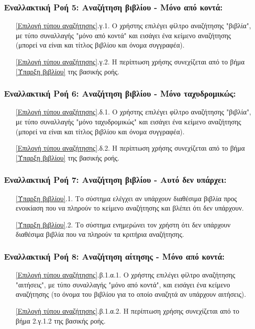\documentclass[12pt,a4paper]{article}
\begin{document}
\subsubsection*{Εναλλακτική Ροή 5: Αναζήτηση βιβλίου - Μόνο από κοντά:}
\begin{enumerate}
    \item[\ref{Επιλογή τύπου αναζήτησης}.γ.1.] Ο χρήστης επιλέγει φίλτρο αναζήτησης "βιβλία", με τύπο συναλλαγής "μόνο από κοντά" και εισάγει ένα κείμενο αναζήτησης (μπορεί να είναι και τίτλος βιβλίου και όνομα συγγραφέα).
    \item[\ref{Επιλογή τύπου αναζήτησης}.γ.2.] Η περίπτωση χρήσης συνεχίζεται από το βήμα \ref{Ύπαρξη βιβλίου} της βασικής ροής.
\end{enumerate}

\subsubsection*{Εναλλακτική Ροή 6: Αναζήτηση βιβλίου - Μόνο ταχυδρομικώς:}
\begin{enumerate}
    \item[\ref{Επιλογή τύπου αναζήτησης}.δ.1.] Ο χρήστης επιλέγει φίλτρο αναζήτησης "βιβλία", με τύπο συναλλαγής "μόνο ταχυδρομικώς" και εισάγει ένα κείμενο αναζήτησης (μπορεί να είναι και τίτλος βιβλίου και όνομα συγγραφέα).
    \item[\ref{Επιλογή τύπου αναζήτησης}.δ.2.] Η περίπτωση χρήσης συνεχίζεται από το βήμα \ref{Ύπαρξη βιβλίου} της βασικής ροής.
\end{enumerate}

\subsubsection*{Εναλλακτική Ροή 7: Αναζήτηση βιβλίου - Αυτό δεν υπάρχει:}
\begin{enumerate}
    \item[\ref{Ύπαρξη βιβλίου}.1.] Το σύστημα ελέγχει αν υπάρχουν διαθέσιμα βιβλία προς ενοικίαση που να πληρούν το κείμενο αναζήτησης και βλέπει ότι δεν υπάρχουν.
    \item[\ref{Ύπαρξη βιβλίου}.2.] Το σύστημα ενημερώνει τον χρήστη ότι δεν υπάρχουν διαθέσιμα βιβλία που να πληρούν τα κριτήρια αναζήτησης. 
\end{enumerate}

\subsubsection*{Εναλλακτική Ροή 8: Αναζήτηση αίτησης - Μόνο από κοντά:}
\begin{enumerate}
    \item[\ref{Επιλογή τύπου αναζήτησης}.β.1.α.1.] Ο χρήστης επιλέγει φίλτρο αναζήτησης "αιτήσεις", με τύπο συναλλαγής "μόνο από κοντά", και εισάγει ένα κείμενο αναζήτησης (το όνομα του βιβλίου για το οποίο αναζητά αν υπάρχουν αιτήσεις).
    \item[\ref{Επιλογή τύπου αναζήτησης}.β.1.α.2.] Η περίπτωση χρήσης συνεχίζεται από το βήμα 2.γ.1.2 της βασικής ροής.
\end{enumerate}
\end{document}
